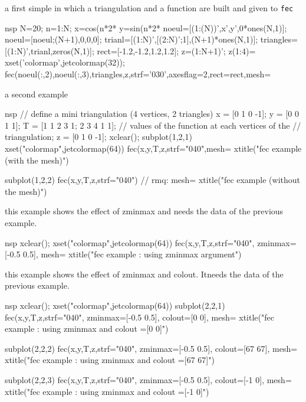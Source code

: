 \begin{examples}

\noindent a first simple in which a triangulation and a function are
built and given to \verb!fec!
\begin{mintednsp}{nsp}
N=20;
n=1:N;
x=cos(n*2*%
y=sin(n*2*%
noeul=[(1:(N))',x',y',0*ones(N,1)];
noeul=[noeul;(N+1),0,0,0];
trianl=[(1:N)',[(2:N)';1],(N+1)*ones(N,1)];
triangles=[(1:N)',trianl,zeros(N,1)];
rect=[-1.2,-1.2,1.2,1.2];
z=(1:N+1)';
z(1:4)=%
xset('colormap',jetcolormap(32));
fec(noeul(:,2),noeul(:,3),triangles,z,strf='030',axesflag=2,rect=rect,mesh=%
\end{mintednsp}

\noindent a second example

\begin{mintednsp}{nsp}
// define a mini triangulation (4 vertices, 2 triangles)
x = [0 1 0 -1];
y = [0 0 1  1];
T = [1 1 2 3 1;
     2 3 4 1 1];
// values of the function at each vertices of the
// triangulation;
z = [0 1 0 -1];
xclear();
subplot(1,2,1)
xset("colormap",jetcolormap(64))
fec(x,y,T,z,strf="040",mesh=%
xtitle("fec example (with the mesh)")

subplot(1,2,2)
fec(x,y,T,z,strf="040")  // rmq: mesh=%
xtitle("fec example (without the mesh)")
\end{mintednsp}

\noindent this example shows the effect of zminmax
and needs the data of the previous example.

\begin{mintednsp}{nsp}
xclear();
xset("colormap",jetcolormap(64))
fec(x,y,T,z,strf="040", zminmax=[-0.5 0.5], mesh=%
xtitle("fec example : using zminmax argument")
\end{mintednsp}

\noindent this example shows the effect of zminmax
and colout. Itneeds the data of the previous example.

\begin{mintednsp}{nsp}
xclear();
xset("colormap",jetcolormap(64))
subplot(2,2,1)
fec(x,y,T,z,strf="040", zminmax=[-0.5 0.5], colout=[0 0], mesh=%
xtitle("fec example : using zminmax and colout =[0 0]")

subplot(2,2,2)
fec(x,y,T,z,strf="040", zminmax=[-0.5 0.5], colout=[67 67], mesh=%
xtitle("fec example : using zminmax and colout =[67 67]")

subplot(2,2,3)
fec(x,y,T,z,strf="040", zminmax=[-0.5 0.5], colout=[-1 0], mesh=%
xtitle("fec example : using zminmax and colout =[-1 0]")


\end{mintednsp}
\end{examples}
